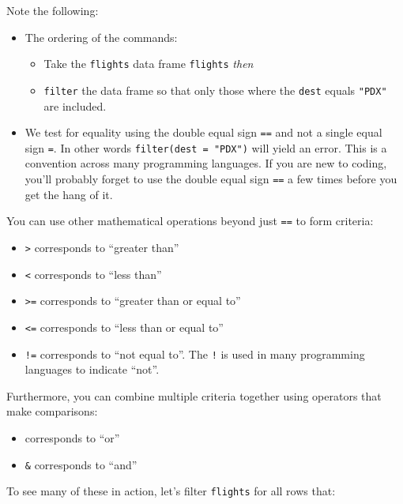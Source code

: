 \documentclass[
  letterpaper,
  DIV=11,
  numbers=noendperiod]{scrreprt}
\providecommand{\tightlist}{%
  \setlength{\itemsep}{0pt}\setlength{\parskip}{0pt}}\usepackage{longtable,booktabs,array}
\theoremstyle{definition}
\theoremstyle{remark}
\begin{document}
Note the following:

\begin{itemize}
\tightlist
\item
  The ordering of the commands:

  \begin{itemize}
  \tightlist
  \item
    Take the \texttt{flights} data frame \texttt{flights} \emph{then}
  \item
    \texttt{filter} the data frame so that only those where the
    \texttt{dest} equals \texttt{"PDX"} are included.
  \end{itemize}
\item
  We test for equality using the double equal sign \texttt{==} and not a
  single equal sign \texttt{=}. In other words
  \texttt{filter(dest\ =\ "PDX")} will yield an error. This is a
  convention across many programming languages. If you are new to
  coding, you'll probably forget to use the double equal sign
  \texttt{==} a few times before you get the hang of it.
\end{itemize}

You can use other mathematical operations beyond just \texttt{==} to
form criteria:

\begin{itemize}
\tightlist
\item
  \texttt{\textgreater{}} corresponds to ``greater than''
\item
  \texttt{\textless{}} corresponds to ``less than''
\item
  \texttt{\textgreater{}=} corresponds to ``greater than or equal to''
\item
  \texttt{\textless{}=} corresponds to ``less than or equal to''
\item
  \texttt{!=} corresponds to ``not equal to''. The \texttt{!} is used in
  many programming languages to indicate ``not''.
\end{itemize}

Furthermore, you can combine multiple criteria together using operators
that make comparisons:

\begin{itemize}
\tightlist
\item
  \texttt{\textbar{}} corresponds to ``or''
\item
  \texttt{\&} corresponds to ``and''
\end{itemize}

To see many of these in action, let's filter \texttt{flights} for all
rows that:
\end{document}

